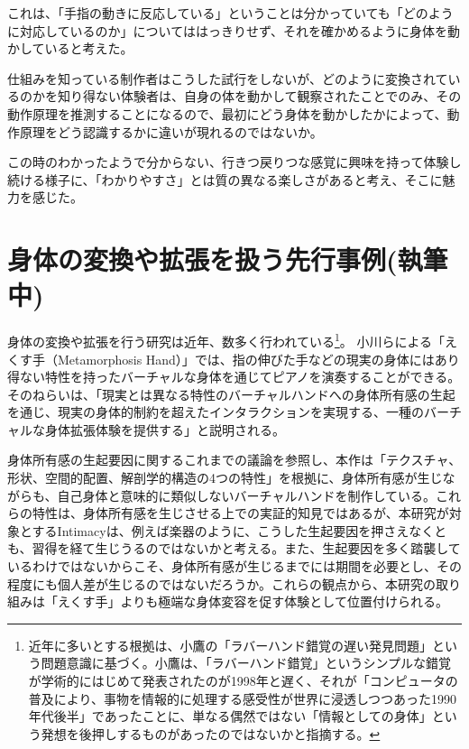 これは、「手指の動きに反応している」ということは分かっていても「どのように対応しているのか」についてははっきりせず、それを確かめるように身体を動かしていると考えた。

仕組みを知っている制作者はこうした試行をしないが、どのように変換されているのかを知り得ない体験者は、自身の体を動かして観察されたことでのみ、その動作原理を推測することになるので、最初にどう身体を動かしたかによって、動作原理をどう認識するかに違いが現れるのではないか。

この時のわかったようで分からない、行きつ戻りつな感覚に興味を持って体験し続ける様子に、「わかりやすさ」とは質の異なる楽しさがあると考え、そこに魅力を感じた。

\section{身体の変換や拡張を扱う先行事例(執筆中)}
身体の変換や拡張を行う研究は近年、数多く行われている\footnote{近年に多いとする根拠は、小鷹の「ラバーハンド錯覚の遅い発見問題」という問題意識に基づく。小鷹は、「ラバーハンド錯覚」というシンプルな錯覚が学術的にはじめて発表されたのが1998年と遅く、それが「コンピュータの普及により、事物を情報的に処理する感受性が世界に浸透しつつあった1990年代後半」であったことに、単なる偶然ではない「情報としての身体」という発想を後押しするものがあったのではないかと指摘する\cite{kodaka}。}\cite{Kondo2020, ekusute,Kasahara2017,augmented_hand_series}。
小川らによる「えくす手（Metamorphosis Hand）」\cite{ekusute}では、指の伸びた手などの現実の身体にはあり得ない特性を持ったバーチャルな身体を通じてピアノを演奏することができる。そのねらいは、「現実とは異なる特性のバーチャルハンドへの身体所有感の生起を通じ、現実の身体的制約を超えたインタラクションを実現する、一種のバーチャルな身体拡張体験を提供する」と説明される。

身体所有感の生起要因に関するこれまでの議論を参照し、本作は「テクスチャ、形状、空間的配置、解剖学的構造の4つの特性」を根拠に、身体所有感が生じながらも、自己身体と意味的に類似しないバーチャルハンドを制作している。これらの特性は、身体所有感を生じさせる上での実証的知見ではあるが、本研究が対象とするIntimacyは、例えば楽器のように、こうした生起要因を押さえなくとも、習得を経て生じうるのではないかと考える。また、生起要因を多く踏襲しているわけではないからこそ、身体所有感が生じるまでには期間を必要とし、その程度にも個人差が生じるのではないだろうか。これらの観点から、本研究の取り組みは「えくす手」よりも極端な身体変容を促す体験として位置付けられる。

